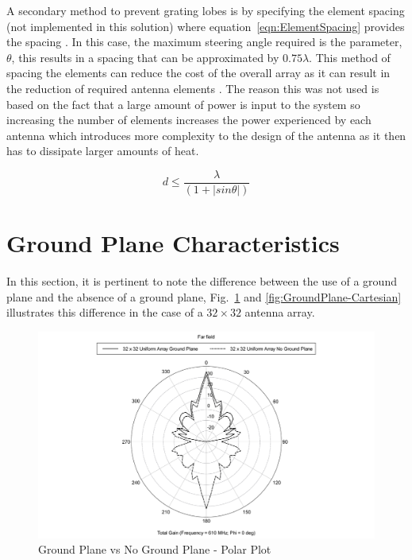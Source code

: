 \documentclass[11pt]{witseiepaper}
\begin{document}
\begin{bibunit}[witseie]
A secondary method to prevent grating lobes is by specifying the element spacing (not implemented in this solution) where equation~\ref{eqn:ElementSpacing} provides the spacing \cite[p.~331]{radarHandbook}. In this case, the maximum steering angle required is the parameter, $\theta$, this results in a spacing that can be approximated by $0.75 \lambda$. 
This method of spacing the elements can reduce the cost of the overall array as it can result in the reduction of required antenna elements \cite[p.~331]{radarHandbook}.
The reason this was not used is based on the fact that a large amount of power is input to the system so increasing the number of elements increases the power experienced by each antenna which introduces more complexity to the design of the antenna as it then has to dissipate larger amounts of heat.

\begin{equation} \label{eqn:ElementSpacing}
d \leq \frac{\lambda}{(1 + | sin \theta |)}
\end{equation}


\section{Ground Plane Characteristics} \label{sec:GroundPlaneCharacteristics}
In this section, it is pertinent to note the difference between the use of a ground plane and the absence of a ground plane, Fig.~\ref{fig:GroundPlane-Polar} and \ref{fig:GroundPlane-Cartesian}  illustrates this difference in the case of a $32 \times 32$ antenna array.

\begin{figure}[htb]
    \centering
    \includegraphics[width=\linewidth]{GroundPlane-Polar.pdf}
    \caption{Ground Plane vs No Ground Plane - Polar Plot}
    \label{fig:GroundPlane-Polar}
\end{figure}


\end{bibunit}
\end{document}
